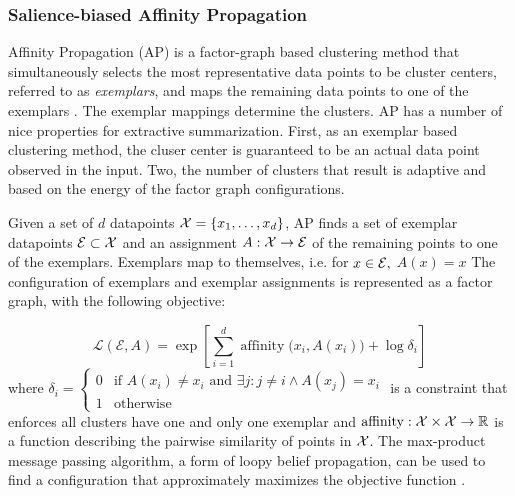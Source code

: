 \subsubsection{Salience-biased Affinity Propagation}


    Affinity Propagation (AP) is a factor-graph based clustering
    method that simultaneously selects the most representative data points 
    to be cluster centers, referred to as \emph{exemplars},  and maps 
    the remaining data points to one of the exemplars 
    \citep{frey2007clustering}. 
    The exemplar mappings determine the clusters.
    AP has a number of nice properties for extractive summarization.
    First, as an exemplar based clustering method, the cluser center
    is guaranteed to be an actual data point observed in the input.
    Two, the number of clusters that result is adaptive and 
    based on the energy of the factor graph configurations.

    Given a set of $d$ datapoints $\mathcal{X} = \{x_1, \ldots, x_d\}$, 
    AP finds a set of
    exemplar datapoints $\mathcal{E} \subset \mathcal{X}$ and an assignment
    $A : \mathcal{X} \rightarrow\mathcal{E}$ of the 
    remaining points to one of the exemplars. Exemplars map to themselves,
    i.e. for $x \in \mathcal{E},$ $A(x) = x$ The configuration of exemplars
    and exemplar assignments is represented as a factor graph, 
    with the following objective:
    
    \[ \mathcal{L}(\mathcal{E}, A) 
        = \exp\left[
            \sum_{i=1}^d \operatorname{affinity}\Big(x_i, A(x_i)\Big) + 
          \log \delta_i \right] \]
    where $\delta_i = \begin{cases} 0 & \textrm{if $A(x_i) \neq x_i$ and $\exists j: j\neq i \wedge A(x_j)=x_i$} \\
1 & \textrm{otherwise}\end{cases}$ is a constraint that enforces all clusters
 have one and only one exemplar and $\operatorname{affinity}:\mathcal{X} 
 \times \mathcal{X} \rightarrow \mathbb{R} $
 is a function describing the pairwise similarity of points in 
 $\mathcal{X}$.
 The max-product message passing algorithm,
 a form of loopy belief propagation, can be used to find a configuration
 that approximately maximizes the objective function \citep{dueck2009affinity}.

